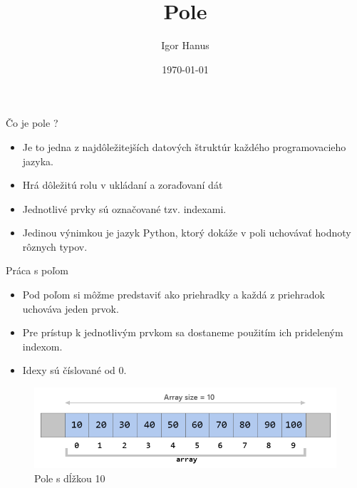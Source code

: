 \documentclass[10pt,xcolor=pdflatex,hyperref={unicode}]{beamer}
\title {Pole}
\author {Igor Hanus}
\institute[FIT]
{
  {\large Fakulta informatiky\\
  VUT Brno}
}
\date {\today}
\begin{document}
\frame{\titlepage}

\begin{frame}{Čo je pole ?}
    \begin{itemize}
        \item Je to jedna z najdôležitejších datových štruktúr každého programovacieho jazyka.
        \item Hrá dôležitú rolu v ukládaní a zoraďovaní dát
        \item Jednotlivé prvky sú označované tzv. indexami.
        \item Jedinou výnimkou je jazyk Python, ktorý dokáže v poli uchovávať hodnoty rôznych typov.
    \end{itemize}
\end{frame}

\begin{frame}{Práca s poľom}
    \begin{itemize}
        \item Pod poľom si môžme predstaviť ako priehradky a každá z priehradok uchováva jeden prvok.
        \item Pre prístup k jednotlivým prvkom sa dostaneme použitím ich prideleným indexom.
        \item Idexy sú číslované od 0.
    \end{itemize}
    
    \begin{figure}
        \centering
        \includegraphics[scale=0.4]{array.png}
        \caption{Pole s dĺžkou 10}
    \end{figure}
\end{frame}

\IncMargin{1.5 em}
            
\end{document}
